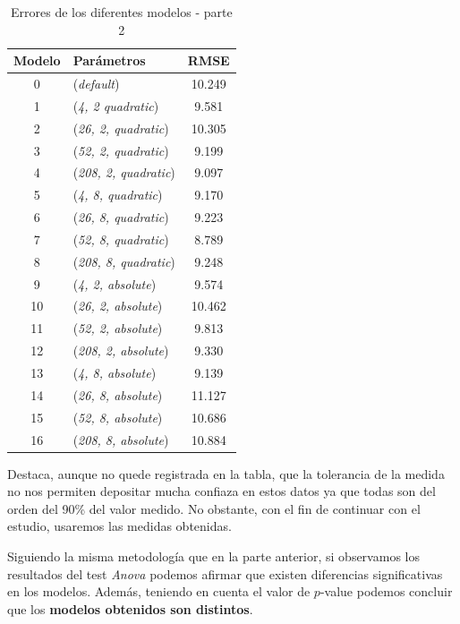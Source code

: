 \documentclass[12pt]{report} %
\begin{document}
\begin{table}[H]
\begin{center}
\begin{tabular}{ |c|l|c| }
    \hline
    Modelo & Parámetros & RMSE\\
    \hline
    \hline
    0 & (\textit{default})              & 10.249\\
    1 & (\textit{4, 2     quadratic})   & 9.581\\
    2 & (\textit{26, 2,   quadratic})   & 10.305\\
    3 & (\textit{52, 2,   quadratic})   & 9.199\\
    4 & (\textit{208, 2,  quadratic})   & 9.097\\
    5 & (\textit{4, 8,    quadratic})   & 9.170\\
    6 & (\textit{26, 8,   quadratic})   & 9.223\\
    7 & (\textit{52, 8,   quadratic})   & 8.789\\
    8 & (\textit{208, 8,  quadratic})   & 9.248\\
    9 & (\textit{4, 2,     absolute})   & 9.574\\
    10 & (\textit{26, 2,   absolute})   & 10.462\\
    11 & (\textit{52, 2,   absolute})   & 9.813\\
    12 & (\textit{208, 2,  absolute})   & 9.330\\
    13 & (\textit{4, 8,    absolute})   & 9.139\\
    14 & (\textit{26, 8,   absolute})   & 11.127\\
    15 & (\textit{52, 8,   absolute})   & 10.686\\
    16 & (\textit{208, 8,  absolute})   & 10.884\\
    \hline
\end{tabular}
\caption{Errores de los diferentes modelos - parte 2}
\end{center}
\end{table}

Destaca, aunque no quede registrada en la tabla, que la tolerancia de la medida no nos permiten depositar mucha confiaza en estos datos ya que todas son del orden del 90\% del valor medido. No obstante, con el fin de continuar con el estudio, usaremos las medidas obtenidas.

Siguiendo la misma metodología que en la parte anterior, si observamos los resultados del test \textit{Anova} podemos afirmar que existen diferencias significativas en los modelos. Además, teniendo en cuenta el valor  de $p$-value podemos concluir que los \textbf{modelos obtenidos son distintos}.
\end{document}
